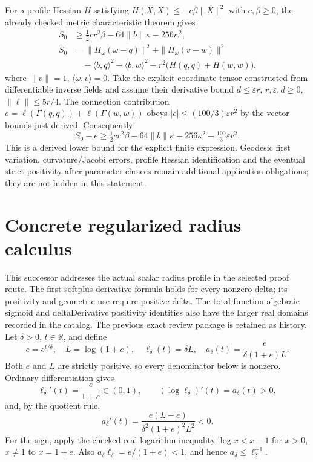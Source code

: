 \documentclass[11pt]{article}
\theoremstyle{definition}
\theoremstyle{remark}
\numberwithin{equation}{section}
\begin{document}
For a profile Hessian $H$ satisfying $H(X,X)\le-c\beta\|X\|^2$
with $c,\beta\ge0$, the already checked metric characteristic theorem
gives
\[
\begin{aligned}
 S_0&\ge\tfrac12 cr^2\beta-64\|b\|\kappa-256\kappa^2,\\
 S_0&=\|\Pi_\omega(\omega-q)\|^2+\|\Pi_\omega(v-w)\|^2\\
 &\quad-\langle b,q\rangle^2-\langle b,w\rangle^2
 -r^2\big(H(q,q)+H(w,w)\big).
\end{aligned}
\]
where $\|v\|=1$, $\langle\omega,v\rangle=0$.
Take the explicit coordinate tensor constructed from differentiable inverse
fields and assume their derivative bound $d\le\varepsilon r$,
$r,\varepsilon,d\ge0$, $\|\ell\|\le5r/4$.
The connection contribution $e=\ell(\Gamma(q,q))+\ell(\Gamma(w,w))$
obeys $|e|\le(100/3)\varepsilon r^2$ by the vector bounds just derived.
Consequently
\[
 S_0-e\ge\tfrac12 cr^2\beta-64\|b\|\kappa-256\kappa^2
                         -\tfrac{100}{3}\varepsilon r^2.
\]
This is a derived lower bound for the explicit finite expression. Geodesic
first variation, curvature/Jacobi errors, profile Hessian identification and
the eventual strict positivity after parameter choices remain additional
application obligations; they are not hidden in this statement.

\clearpage

\section{Concrete regularized radius calculus}\label{radius-formal:definitions}\label{radius-formal:first}\label{radius-formal:concavity}\label{radius-formal:collapse}\label{radius-formal:monotonicity}\label{radius-formal:scale}\label{radius-formal:hessian}
This successor addresses the actual scalar radius profile in the selected proof route. The first softplus derivative formula holds for every nonzero delta; its positivity and geometric use require positive delta. The total-function algebraic sigmoid and deltaDerivative positivity identities also have the larger real domains recorded in the catalog. The previous exact review package is retained as history. Let
$\delta>0$, $t\in\mathbb R$, and define
\[
 e=e^{t/\delta},\quad L=\log(1+e),\quad
 \ell_\delta(t)=\delta L,\quad
 a_\delta(t)=\frac{e}{\delta(1+e)L}.
\]
Both $e$ and $L$ are strictly positive, so every denominator below is
nonzero. Ordinary differentiation gives
\[
 \ell_\delta'(t)=\frac{e}{1+e}\in(0,1),\qquad
 (\log\ell_\delta)'(t)=a_\delta(t)>0,
\]
and, by the quotient rule,
\[
 a_\delta'(t)=
 \frac{e(L-e)}{\delta^2(1+e)^2L^2}<0.
\]
For the sign, apply the checked real logarithm inequality
$\log x<x-1$ for $x>0$, $x\ne1$ to $x=1+e$.
Also $a_\delta\ell_\delta=e/(1+e)<1$, and hence
$a_\delta\le\ell_\delta^{-1}$.
\end{document}
